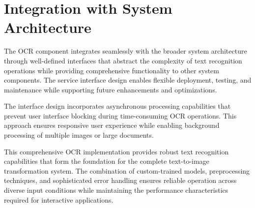\section{Integration with System Architecture}

The OCR component integrates seamlessly with the broader system architecture through well-defined interfaces that abstract the complexity of text recognition operations while providing comprehensive functionality to other system components. The service interface design enables flexible deployment, testing, and maintenance while supporting future enhancements and optimizations.

The interface design incorporates asynchronous processing capabilities that prevent user interface blocking during time-consuming OCR operations. This approach ensures responsive user experience while enabling background processing of multiple images or large documents.

This comprehensive OCR implementation provides robust text recognition capabilities that form the foundation for the complete text-to-image transformation system. The combination of custom-trained models, preprocessing techniques, and sophisticated error handling ensures reliable operation across diverse input conditions while maintaining the performance characteristics required for interactive applications.